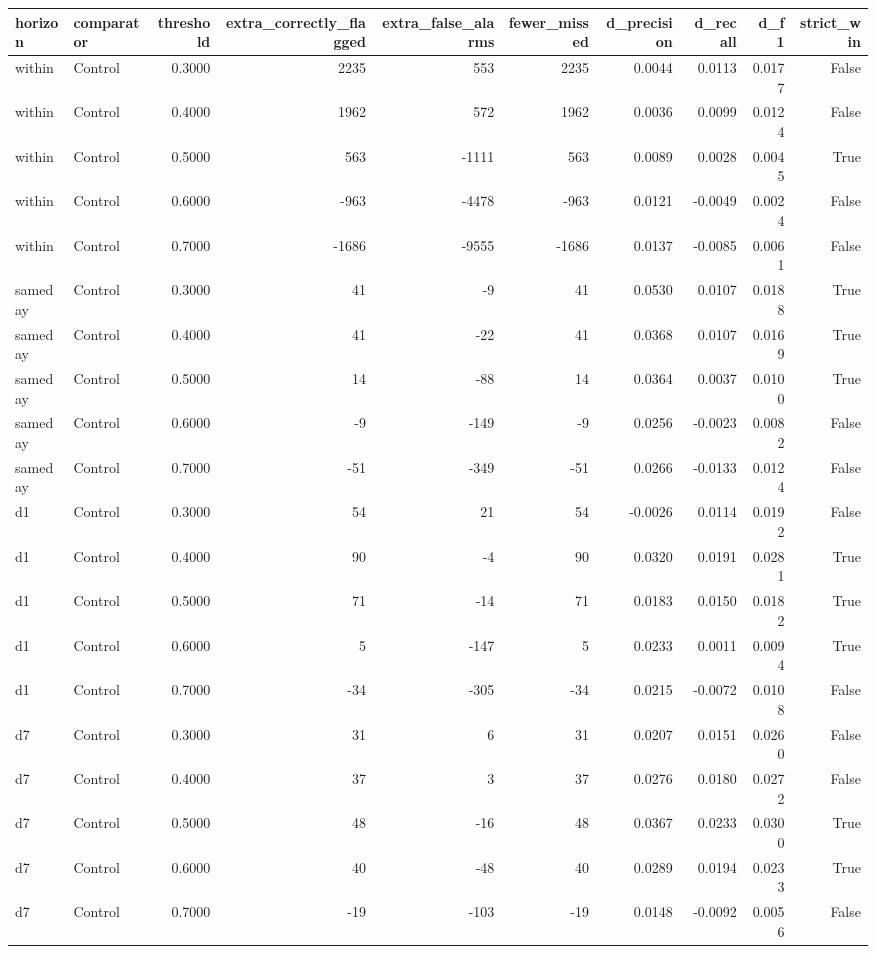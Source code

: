 \begin{tabular}{llrrrrrrrr}
\toprule
horizon & comparator & threshold & extra\_correctly\_flagged & extra\_false\_alarms & fewer\_missed & d\_precision & d\_recall & d\_f1 & strict\_win \\
\midrule
within & Control & 0.3000 & 2235 & 553 & 2235 & 0.0044 & 0.0113 & 0.0177 & False \\
within & Control & 0.4000 & 1962 & 572 & 1962 & 0.0036 & 0.0099 & 0.0124 & False \\
within & Control & 0.5000 & 563 & -1111 & 563 & 0.0089 & 0.0028 & 0.0045 & True \\
within & Control & 0.6000 & -963 & -4478 & -963 & 0.0121 & -0.0049 & 0.0024 & False \\
within & Control & 0.7000 & -1686 & -9555 & -1686 & 0.0137 & -0.0085 & 0.0061 & False \\
sameday & Control & 0.3000 & 41 & -9 & 41 & 0.0530 & 0.0107 & 0.0188 & True \\
sameday & Control & 0.4000 & 41 & -22 & 41 & 0.0368 & 0.0107 & 0.0169 & True \\
sameday & Control & 0.5000 & 14 & -88 & 14 & 0.0364 & 0.0037 & 0.0100 & True \\
sameday & Control & 0.6000 & -9 & -149 & -9 & 0.0256 & -0.0023 & 0.0082 & False \\
sameday & Control & 0.7000 & -51 & -349 & -51 & 0.0266 & -0.0133 & 0.0124 & False \\
d1 & Control & 0.3000 & 54 & 21 & 54 & -0.0026 & 0.0114 & 0.0192 & False \\
d1 & Control & 0.4000 & 90 & -4 & 90 & 0.0320 & 0.0191 & 0.0281 & True \\
d1 & Control & 0.5000 & 71 & -14 & 71 & 0.0183 & 0.0150 & 0.0182 & True \\
d1 & Control & 0.6000 & 5 & -147 & 5 & 0.0233 & 0.0011 & 0.0094 & True \\
d1 & Control & 0.7000 & -34 & -305 & -34 & 0.0215 & -0.0072 & 0.0108 & False \\
d7 & Control & 0.3000 & 31 & 6 & 31 & 0.0207 & 0.0151 & 0.0260 & False \\
d7 & Control & 0.4000 & 37 & 3 & 37 & 0.0276 & 0.0180 & 0.0272 & False \\
d7 & Control & 0.5000 & 48 & -16 & 48 & 0.0367 & 0.0233 & 0.0300 & True \\
d7 & Control & 0.6000 & 40 & -48 & 40 & 0.0289 & 0.0194 & 0.0233 & True \\
d7 & Control & 0.7000 & -19 & -103 & -19 & 0.0148 & -0.0092 & 0.0056 & False \\

\end{tabular}
